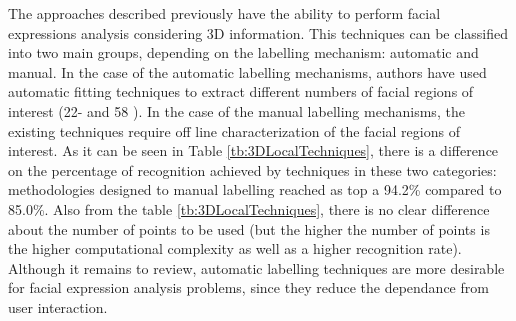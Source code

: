 The approaches described previously have the ability to perform facial expressions analysis considering 3D information. This techniques can be classified into two main groups, depending on the labelling mechanism: automatic and manual. In the case of the automatic labelling mechanisms, authors have used automatic fitting techniques to extract different numbers of facial regions of interest (22- \cite{Rosato2008} and 58 \cite{Wang2007}). In the case of the manual labelling mechanisms, the existing techniques require off line characterization of the facial regions of interest. As it can be seen in Table \ref{tb:3DLocalTechniques}, there is a difference on the percentage of recognition achieved by techniques in these two categories: methodologies designed to manual labelling reached as top a 94.2\% compared to 85.0\%. Also from the table \ref{tb:3DLocalTechniques}, there is no clear difference about the number of points to be used (but the higher the number of points is the higher computational complexity as well as a higher recognition rate). Although it remains to review, automatic labelling techniques are more desirable for facial expression analysis problems, since they reduce the dependance from user interaction.

